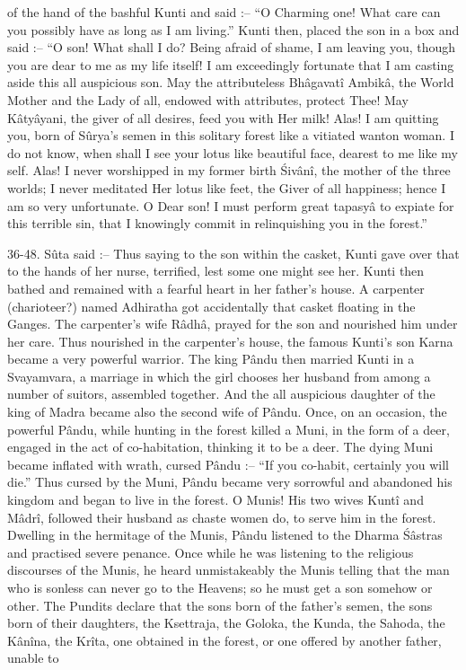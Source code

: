 of the hand of the bashful Kunti and said :-- ``O Charming one! What care can you possibly have as            long as I am living.'' Kunti then, placed the son in a box and said :-- ``O son! What shall I do? Being afraid of shame, I am leaving you, though you are dear to me as my life itself! I am exceedingly fortunate that I am casting aside this all auspicious son. May the attributeless Bh\^agavat\^i Ambik\^a, the World Mother and the Lady of all, endowed with attributes, protect Thee! May K\^aty\^ayani, the giver of all desires, feed you with Her milk! Alas! I am quitting you, born of S\^urya's semen in this solitary forest like a vitiated wanton woman. I do not know, when shall I see your lotus like beautiful face, dearest to me like my self. Alas! I never worshipped in my former birth \'Siv\^an\^i, the mother of the three worlds; I never meditated Her lotus like feet, the Giver of all happiness; hence I am so very unfortunate. O Dear son! I must perform great tapasy\^a to expiate for this terrible sin, that I knowingly commit in relinquishing you in the forest.''

36-48. S\^uta said :-- Thus saying to the son within the casket, Kunti gave over that to the hands of her nurse, terrified, lest some one might see her. Kunti then bathed and remained with a fearful heart in her father's house. A carpenter (charioteer?) named Adhiratha got accidentally that casket floating in the Ganges. The carpenter's wife R\^adh\^a, prayed for the son and nourished him under her care. Thus nourished in the carpenter's house, the famous Kunti's son Karna became a very powerful warrior. The king P\^andu then married Kunti in a Svayamvara, a marriage in which the girl chooses her husband from among a number of suitors, assembled together. And the all auspicious daughter of the king of Madra became also the second wife of P\^andu. Once, on an occasion, the powerful P\^andu, while hunting in the forest killed a Muni, in the form of a deer, engaged in the act of co-habitation, thinking it to be a deer. The dying Muni became inflated with wrath, cursed P\^andu :-- ``If you co-habit, certainly you will die.'' Thus cursed by the Muni, P\^andu became very sorrowful and abandoned his kingdom and began to live in the forest. O Munis! His two wives Kunt\^i and M\^adr\^i, followed their husband as chaste women do, to serve him in the forest. Dwelling in the hermitage of the Munis, P\^andu listened to the Dharma \'S\^astras and practised severe penance. Once while he was listening to the religious discourses of the Munis, he heard unmistakeably the Munis telling that the man who is sonless can never go to the Heavens; so he must get a son somehow or other. The Pundits declare that the sons born of the father's semen, the sons born of their daughters, the Ksettraja, the Goloka, the Kunda, the Sahoda, the K\^an\^ina, the Kr\^ita, one obtained in the forest, or one offered by another father, unable to

